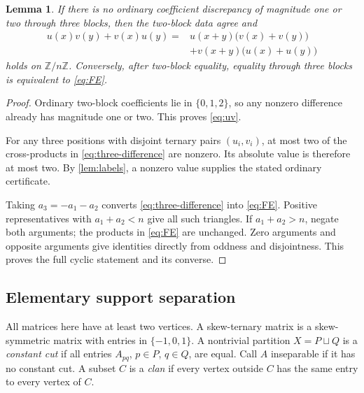 \documentclass[11pt,a4paper]{amsart}
\numberwithin{equation}{section}
\theoremstyle{plain}
\newtheorem{lemma}[theorem]{Lemma}
\theoremstyle{definition}
\newcommand{\Z}{\mathbb Z}
\begin{document}
\begin{lemma}\label{lem:low-order}
If there is no ordinary coefficient discrepancy of magnitude one or two
through three blocks, then the two-block data agree and
\begin{equation}\label{eq:FE}
\begin{aligned}
u(x)v(y)+v(x)u(y)
={}&u(x+y)\bigl(v(x)+v(y)\bigr)\\
&+v(x+y)\bigl(u(x)+u(y)\bigr)
\end{aligned}
\end{equation}
holds on \(\Z/n\Z\).  Conversely, after two-block equality, equality through
three blocks is equivalent to \eqref{eq:FE}.
\end{lemma}
\begin{proof}
Ordinary two-block coefficients lie in \(\{0,1,2\}\), so any nonzero difference
already has magnitude one or two.  This proves \eqref{eq:uv}.

For any three positions with disjoint ternary pairs \((u_i,v_i)\), at most
two of the cross-products in \eqref{eq:three-difference} are nonzero.
Its absolute value is therefore at most two.  By \cref{lem:labels}, a nonzero
value supplies the stated ordinary certificate.

Taking \(a_3=-a_1-a_2\) converts \eqref{eq:three-difference} into
\eqref{eq:FE}.  Positive representatives with \(a_1+a_2<n\) give all such
triangles.  If \(a_1+a_2>n\), negate both arguments; the products in
\eqref{eq:FE} are unchanged.  Zero arguments and opposite arguments give
identities directly from oddness and disjointness.  This proves the full
cyclic statement and its converse.
\end{proof}

\subsection{Elementary support separation}\label{subsec:support}

All matrices here have at least two vertices.  A skew-ternary matrix is a
skew-symmetric matrix with entries in \(\{-1,0,1\}\).
A nontrivial partition \(X=P\sqcup Q\) is a \emph{constant cut} if all
entries \(A_{pq}\), \(p\in P\), \(q\in Q\), are equal.  Call \(A\) inseparable
if it has no constant cut.  A subset \(C\) is a \emph{clan} if every vertex
outside \(C\) has the same entry to every vertex of \(C\).
\end{document}
